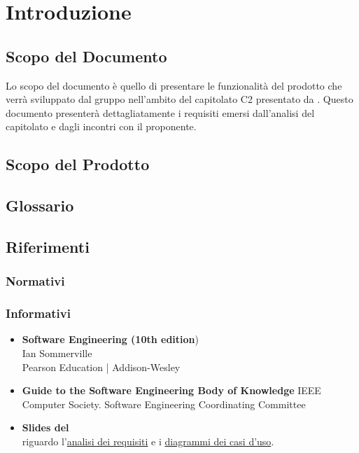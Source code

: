 \section{Introduzione}
\label{sec:Introduzione}

	\subsection{Scopo del Documento}
	\label{sub:ScopoDocumento}
	
	Lo scopo del documento è quello di presentare le funzionalità del prodotto che verrà sviluppato dal gruppo \AUTORE{} nell'ambito del capitolato C2 presentato da \PROPONENTE. Questo documento presenterà dettagliatamente i requisiti emersi dall'analisi del capitolato e dagli incontri con il proponente.
	
	\subsection{Scopo del Prodotto}
	\label{sub:ScopoProdotto}
		\SCOPO
	
	\subsection{Glossario}
	\label{sub:Glossario}
		\GLOSSARIO
		
	
	\subsection{Riferimenti}
	\label{sub:Riferimenti}
		\subsubsection{Normativi}
			\NORMATIVI
		\subsubsection{Informativi}
			\begin{itemize}
				\item \textbf{Software Engineering (10th edition}) \\
				Ian Sommerville \\
				Pearson Education | Addison-Wesley
				\item \textbf{Guide to the Software Engineering Body of Knowledge}
				IEEE Computer Society. Software Engineering Coordinating Committee
				\item \textbf{Slides del \COMMITTENTE} \\ riguardo l'\href{http://www.math.unipd.it/~tullio/IS-1/2015/Dispense/L06.pdf}{analisi dei requisiti} e i \href{http://www.math.unipd.it/~tullio/IS-1/2015/Dispense/E02.pdf}{diagrammi dei casi d'uso}.
			\end{itemize}
		